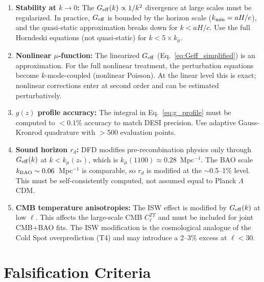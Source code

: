 \documentclass[11pt,a4paper]{article}
\newcommand{\LCDM}{$\Lambda$CDM}
\newcommand{\kmu}{k_\mu}
\newcommand{\Geff}{G_{\rm eff}}
\begin{document}
\begin{enumerate}
\item \textbf{Stability at $k \to 0$:} The $\Geff(k) \propto 1/k^2$
  divergence at large scales must be regularized. In practice,
  $\Geff$ is bounded by the horizon scale ($k_{\rm min} = aH/c$),
  and the quasi-static approximation breaks down for
  $k < aH/c$. Use the full Horndeski equations (not quasi-static)
  for $k < 5 \times \kmu$.

\item \textbf{Nonlinear $\mu$-function:} The linearized $\Geff$
  (Eq.~\eqref{eq:Geff_simplified}) is an approximation. For the full
  nonlinear treatment, the perturbation equations become
  $k$-mode-coupled (nonlinear Poisson). At the linear level this is
  exact; nonlinear corrections enter at second order and can be
  estimated perturbatively.

\item \textbf{$g(z)$ profile accuracy:} The integral in
  Eq.~\eqref{eq:g_profile} must be computed to $<0.1\%$ accuracy
  to match DESI precision. Use adaptive Gauss-Kronrod quadrature
  with $>$500 evaluation points.

\item \textbf{Sound horizon $r_d$:} DFD modifies pre-recombination
  physics only through $\Geff(k)$ at $k < \kmu(z_*)$, which is
  $\kmu(1100) \approx 0.28$~Mpc$^{-1}$. The BAO scale
  $k_{\rm BAO} \sim 0.06$~Mpc$^{-1}$ is comparable, so $r_d$ is
  modified at the $\sim$0.5--1\% level. This must be self-consistently
  computed, not assumed equal to Planck \LCDM{}.

\item \textbf{CMB temperature anisotropies:} The ISW effect is
  modified by $\Geff(k)$ at low $\ell$. This affects the large-scale
  CMB $C_\ell^{TT}$ and must be included for joint CMB+BAO fits.
  The ISW modification is the cosmological analogue of the Cold Spot
  overprediction (T4) and may introduce a 2--3\% excess at $\ell < 30$.
\end{enumerate}


\part{Falsification Criteria}
\label{part:falsification}

\end{document}
